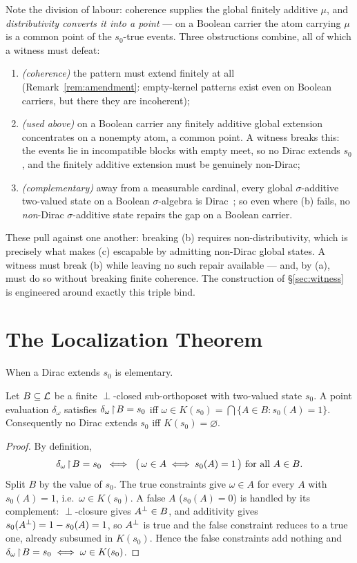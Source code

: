 Note the division of labour: coherence supplies the global finitely additive
$\mu$, and \emph{distributivity converts it into a point} --- on a Boolean carrier
the atom carrying $\mu$ is a common point of the $s_0$-true events. Three
obstructions combine, all of which a witness must defeat:
\begin{enumerate}[label=\textup{(\alph*)}]
  \item \emph{(coherence)} the pattern must extend finitely at all
    (Remark~\ref{rem:amendment}: empty-kernel patterns exist even on Boolean
    carriers, but there they are incoherent);
  \item \emph{(used above)} on a Boolean carrier any finitely additive global
    extension concentrates on a nonempty atom, a common point. A witness breaks
    this: the events lie in incompatible blocks with empty meet, so no Dirac
    extends $s_0$, and the finitely additive extension must be genuinely
    non-Dirac;
  \item \emph{(complementary)} away from a measurable cardinal, every global
    $\sigma$-additive two-valued state on a Boolean $\sigma$-algebra is
    Dirac~\cite{Sikorski1964,Jech2003}; so even where (b) fails, no \emph{non}-Dirac
    $\sigma$-additive state repairs the gap on a Boolean carrier.
\end{enumerate}
These pull against one another: breaking (b) requires non-distributivity, which is
precisely what makes (c) escapable by admitting non-Dirac global states. A witness
must break (b) while leaving no such repair available --- and, by (a), must do so
without breaking finite coherence. The construction of \S\ref{sec:witness} is
engineered around exactly this triple bind.


\section{The Localization Theorem}\label{sec:localization}

When a Dirac extends $s_0$ is elementary.

\begin{lemma}\label{lem:dirac-iff}
Let $B \subseteq \mathcal{L}$ be a finite $\perp$-closed sub-orthoposet with two-valued
state $s_0$. A point evaluation $\delta_\omega$ satisfies $\delta_\omega\!\restriction\! B
= s_0$ iff $\omega \in K(s_0) = \bigcap\{A \in B : s_0(A) = 1\}$. Consequently no
Dirac extends $s_0$ iff $K(s_0) = \varnothing$.
\end{lemma}

\begin{proof}
By definition,
\[
  \delta_\omega\!\restriction\! B = s_0
  \;\iff\;
  \bigl(\,\omega \in A \iff s_0(A)=1\,\bigr) \text{ for all } A \in B .
\]
Split $B$ by the value of $s_0$. The true constraints give $\omega \in A$ for every
$A$ with $s_0(A)=1$, i.e.\ $\omega \in K(s_0)$. A false $A$ ($s_0(A)=0$) is handled by
its complement: $\perp$-closure gives $A{}^{\perp} \in B$, and additivity gives
$s_0(A{}^{\perp}) = 1 - s_0(A) = 1$, so $A{}^{\perp}$ is true and the false constraint reduces
to a true one, already subsumed in $K(s_0)$. Hence the false constraints add nothing
and $\delta_\omega\!\restriction\! B = s_0 \iff \omega \in K(s_0)$.
\end{proof}

